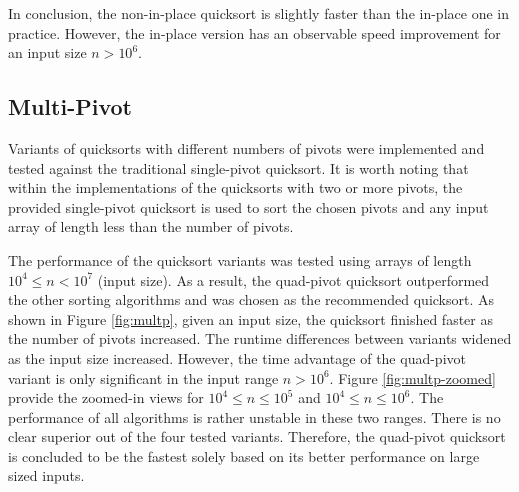 \documentclass[titlepage, 12pt]{article}
\begin{document}
In conclusion, the non-in-place quicksort is slightly faster than the in-place
one in practice. However, the in-place version has an observable speed
improvement for an input size \( n > 10^6 \).

\subsection{Multi-Pivot}
\label{sec:multp}

Variants of quicksorts with different numbers of pivots were implemented and
tested against the traditional single-pivot quicksort. It is worth noting that
within the implementations of the quicksorts with two or more pivots, the
provided single-pivot quicksort is used to sort the chosen pivots and any input
array of length less than the number of pivots.

The performance of the quicksort variants was tested using arrays of length \(
10^4 \leq n < 10^7 \) (input size). As a result, the quad-pivot quicksort
outperformed the other sorting algorithms and was chosen as the recommended
quicksort. As shown in Figure \ref{fig:multp}, given an input size, the
quicksort finished faster as the number of pivots increased. The runtime
differences between variants widened as the input size increased. However, the
time advantage of the quad-pivot variant is only significant in the input range
\( n > 10^6 \). Figure \ref{fig:multp-zoomed} provide the zoomed-in views for \(
10^4 \leq n \leq 10^5 \) and \( 10^4 \leq n \leq 10^6 \). The performance of all
algorithms is rather unstable in these two ranges. There is no clear superior
out of the four tested variants. Therefore, the quad-pivot quicksort is
concluded to be the fastest solely based on its better performance on large
sized inputs.
\end{document}
